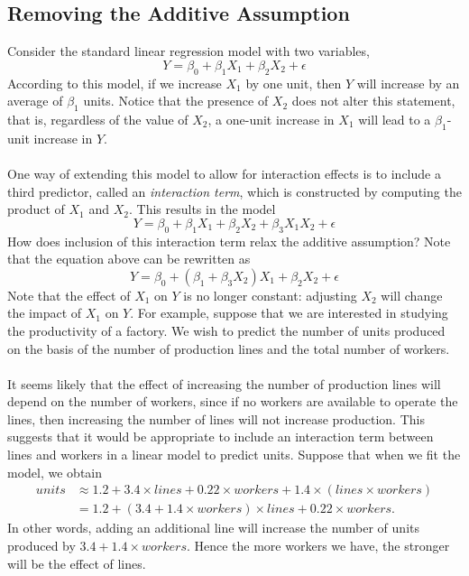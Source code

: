 \subsection{Removing the Additive Assumption}
Consider the standard linear regression model with two variables,
\[Y = \beta_0 + \beta_1 X_1 + \beta_2 X_2 + \epsilon\]
According to this model, if we increase $X_1$ by one unit, then $Y$ will increase by an average of $\beta_1$ units. Notice that the presence of $X_2$ does not alter this statement, that is, regardless of the value of $X_2$, a one-unit increase in $X_1$ will lead to a $\beta_1$-unit increase in $Y$.\\\\
One way of extending this model to allow for interaction effects is to include a third predictor, called an \textit{interaction term}, which is constructed by computing the product of $X_1$ and $X_2$. This results in the model
\[Y = \beta_0 + \beta_1 X_1 + \beta_2 X_2 + \beta_3 X_1X_2 + \epsilon\]
How does inclusion of this interaction term relax the additive assumption? Note that the equation above can be rewritten as
\[Y = \beta_0 +  (\beta_1 + \beta_3X_2)X_1 + \beta_2X_2 + \epsilon\]
Note that the effect of $X_1$ on $Y$ is no longer constant: adjusting $X_2$ will change the impact of $X_1$ on $Y$. For example, suppose that we are interested in studying the productivity of a factory. We wish to predict the number of units produced on the basis of the number of production lines and the total number of workers.\\\\
It seems likely that the effect of increasing the number of production lines will depend on the number of workers, since if no workers are available to operate the lines, then increasing the number of lines will not increase production. This suggests that it would be appropriate to include an interaction term between lines and workers in a linear model to predict units. Suppose that when we fit the model, we obtain
\[
\begin{split}
    units & \approx 1.2+3.4 \times lines + 0.22 \times workers + 1.4 \times (lines \times workers)\\
    & = 1.2 + (3.4+1.4 \times workers) \times lines + 0.22 \times workers.
\end{split}
\]
In other words, adding an additional line will increase the number of units produced by $3.4+1.4 \times workers$. Hence the more workers we have, the stronger will be the effect of lines.\\\\
